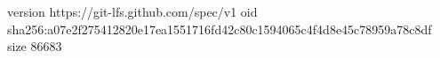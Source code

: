 version https://git-lfs.github.com/spec/v1
oid sha256:a07e2f275412820e17ea1551716fd42c80c1594065c4f4d8e45c78959a78c8df
size 86683

